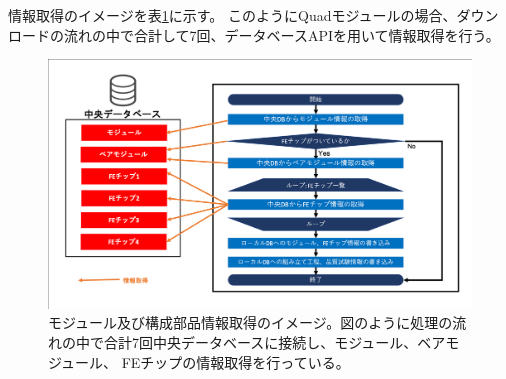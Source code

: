 情報取得のイメージを表\ref{download_process_image}に示す。
このようにQuadモジュールの場合、ダウンロードの流れの中で合計して7回、データベースAPIを用いて情報取得を行う。
\begin{figure}[bpt]\centering
\includegraphics[width=15cm]{./download_process_image.png}
\caption[モジュール及び構成部品情報取得のイメージ図]{モジュール及び構成部品情報取得のイメージ。図のように処理の流れの中で合計7回中央データベースに接続し、モジュール、ベアモジュール、 FEチップの情報取得を行っている。}
\label{download_process_image}
\end{figure}

